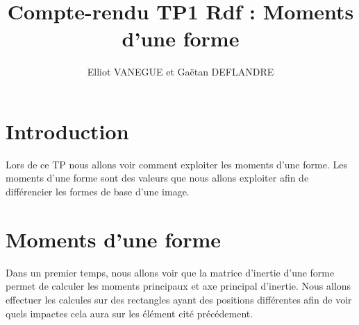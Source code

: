 \documentclass{article}
\title{Compte-rendu TP1 Rdf : Moments d'une forme}
\author{Elliot VANEGUE et Gaëtan DEFLANDRE}
\begin{document}


  \maketitle
  
  \mbox{}
  \newpage
  \clearpage
  
  \section{Introduction}
  Lors de ce TP nous allons voir comment exploiter les moments d'une forme. Les moments
  d'une forme sont des valeurs que nous allons exploiter afin de différencier les formes
  de base d'une image.
  
  \section{Moments d'une forme}
  Dans un premier temps, nous allons voir que la matrice d'inertie d'une forme permet de calculer 
  les moments principaux et axe principal d'inertie. Nous allons effectuer les calcules sur des 
  rectangles ayant des positions différentes afin de voir quels impactes cela aura sur les 
  élément cité précédement.\\
  
\end{document}
